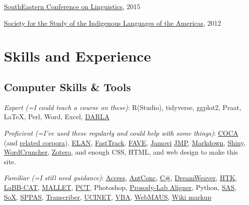 \documentclass[
]{article}
\begin{document}
\href{http://secol.org}{SouthEastern Conference on Linguistics}, 2015

\href{http://www.ssila.org}{Society for the Study of the Indigenous
Languages of the Americas}, 2012

\hypertarget{skills-and-experience}{%
\section{Skills and Experience}\label{skills-and-experience}}

\hypertarget{computer-skills-tools}{%
\subsection{Computer Skills \& Tools}\label{computer-skills-tools}}

\emph{Expert (=I could teach a course on these)}: R(Studio), tidyverse,
ggplot2, Praat, LaTeX, Perl, Word, Excel,
\href{http://darla.dartmouth.edu}{DARLA}

\emph{Proficient (=I've used these regularly and could help with some
things)}: \href{http://corpus.byu.edu/coca/}{COCA} (and
\href{http://corpus.byu.edu}{related corpora}),
\href{https://archive.mpi.nl/tla/elan}{ELAN},
\href{https://github.com/santiagobarreda/FastTrack}{FastTrack},
\href{http://fave.ling.upenn.edu}{FAVE},
\href{https://www.jamovi.org}{Jamovi}
\href{http://www.jmp.com/en_us/home.html}{JMP},
\href{http://daringfireball.net/projects/markdown/}{Markdown},
\href{http://shiny.rstudio.com}{Shiny},
\href{http://www.wordcruncher.com/index.html}{WordCruncher},
\href{https://www.zotero.org}{Zotero}, and enough CSS, HTML, and web
design to make this site.

\emph{Familiar (=I still need guidance)}:
\href{https://products.office.com/en-US/access}{Access},
\href{http://www.laurenceanthony.net/software.html}{AntConc},
\href{https://en.wikipedia.org/wiki/C_Sharp_(programming_language)}{C\#},
\href{http://www.adobe.com/products/dreamweaver.html?sdid=KKQTJ\&mv=search\&s_kwcid=AL!3085!3!110812694443!e!!g!!dreamweaver\&ef_id=V7iPrwAAAUYcBTnE:20160826185837:s}{DreamWeaver},
\href{http://htk.eng.cam.ac.uk}{HTK},
\href{http://labbcat.sourceforge.net}{LaBB-CAT},
\href{http://mallet.cs.umass.edu/index.php}{MALLET},
\href{http://phonologicalcorpustools.github.io/CorpusTools/}{PCT},
Photoshop, \href{http://prosodylab.org/tools/aligner/}{Prosody-Lab
Aligner}, Python, \href{http://www.sas.com/}{SAS},
\href{http://sox.sourceforge.net}{SoX},
\href{http://www.sppas.org}{SPPAS},
\href{http://trans.sourceforge.net/en/presentation.php}{Transcriber},
\href{https://sites.google.com/site/ucinetsoftware/home}{UCINET},
\href{https://en.wikipedia.org/wiki/Visual_Basic_for_Applications}{VBA},
\href{http://clarin.phonetik.uni-muenchen.de/BASWebServices/\#/services/WebMAUSBasic}{WebMAUS},
\href{https://en.wikipedia.org/wiki/Help:Wiki_markup}{Wiki markup}
\end{document}
